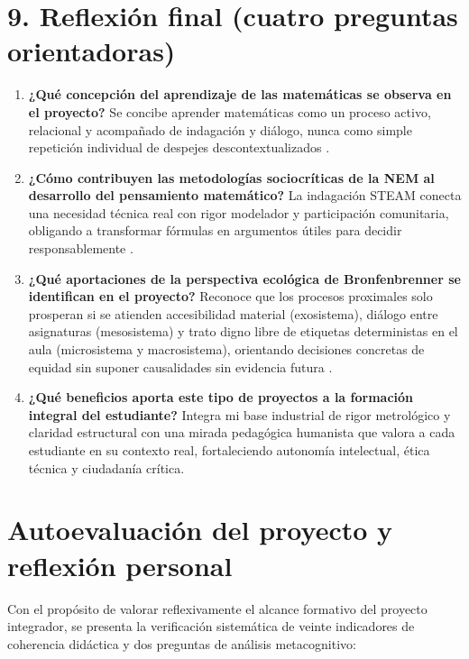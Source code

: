 \documentclass[spanish,letterpaper,oneside]{article}
\begin{document}
\section{9. Reflexión final (cuatro preguntas orientadoras)}
\begin{enumerate}
  \item \textbf{¿Qué concepción del aprendizaje de las matemáticas se observa en el proyecto?} Se concibe aprender matemáticas como un proceso activo, relacional y acompañado de indagación y diálogo, nunca como simple repetición individual de despejes descontextualizados \citep{sawyer2008optimizing}.
  \item \textbf{¿Cómo contribuyen las metodologías sociocríticas de la NEM al desarrollo del pensamiento matemático?} La indagación STEAM conecta una necesidad técnica real con rigor modelador y participación comunitaria, obligando a transformar fórmulas en argumentos útiles para decidir responsablemente \citep{sep2022plan}.
  \item \textbf{¿Qué aportaciones de la perspectiva ecológica de Bronfenbrenner se identifican en el proyecto?} Reconoce que los procesos proximales solo prosperan si se atienden accesibilidad material (exosistema), diálogo entre asignaturas (mesosistema) y trato digno libre de etiquetas deterministas en el aula (microsistema y macrosistema), orientando decisiones concretas de equidad sin suponer causalidades sin evidencia futura \citep{bronfenbrenner2006bioecologico}.
  \item \textbf{¿Qué beneficios aporta este tipo de proyectos a la formación integral del estudiante?} Integra mi base industrial de rigor metrológico y claridad estructural con una mirada pedagógica humanista que valora a cada estudiante en su contexto real, fortaleciendo autonomía intelectual, ética técnica y ciudadanía crítica.
\end{enumerate}

\section*{Autoevaluación del proyecto y reflexión personal}
Con el propósito de valorar reflexivamente el alcance formativo del proyecto integrador, se presenta la verificación sistemática de veinte indicadores de coherencia didáctica y dos preguntas de análisis metacognitivo:
\end{document}
